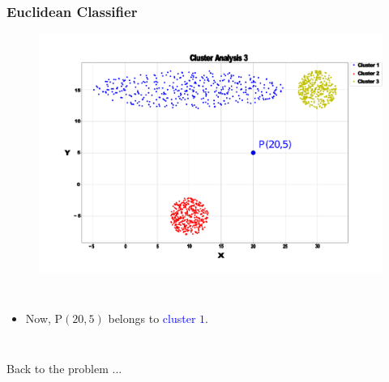 \documentclass[aspectratio=10]{beamer} %
\begin{document}
%

\begin{frame}
	\frametitle{Euclidean Classifier}
	\begin{figure}[H]
		\includegraphics[scale=0.14]{Imagens/clusteranalise3blue.pdf}
	\end{figure}
	
	\begin{columns}
		\footnotesize
		\justifying
		\begin{itemize}
			\item Now, P$(20,5)$ belongs to  \textcolor{blue}{cluster $1$}.
		\end{itemize}
	\end{columns}
\end{frame}

\begin{frame}
	\begin{huge}
		\centering
		Back to the problem ...
	\end{huge}
\end{frame}
\end{document}
